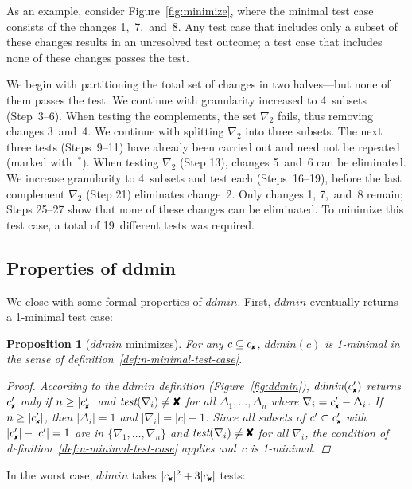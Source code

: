 \documentclass{acm_proc_article-sp}
\newcommand{\FAIL}{\text{\ding{56}}\xspace}
\newcommand{\cfail}{{c_{\scriptscriptstyle \FAIL}}}
\newcommand{\dfail}{{c'_{\scriptscriptstyle \FAIL}}}
\newcommand{\test}{\textit{test}\xspace}
\newcommand{\ddmin}{\textit{ddmin}\xspace}
\theoremstyle{plain}
\newtheorem{proposition}[definition]{Proposition}
\begin{document}
As an example, consider Figure~\ref{fig:minimize}, where the minimal
test case consists of the changes 1,~7,~and~8.  Any test case that
includes only a subset of these changes results in an unresolved test
outcome; a test case that includes none of these changes passes the
test.

We begin with partitioning the total set of changes in two
halves---but none of them passes the test.  We continue with
granularity increased to 4~subsets (Step~3--6).  When testing the
complements, the set $\nabla_2$ fails, thus removing changes 3~and~4.  We
continue with splitting $\nabla_2$ into three subsets.  The next three
tests (Steps~9--11) have already been carried out and need not be
repeated (marked with~${}^*$).  When testing $\nabla_2$ (Step 13), changes
5~and~6 can be eliminated.  We increase granularity to 4~subsets and
test each (Steps~16--19), before the last complement $\nabla_2$ (Step 21)
eliminates change~2.  Only changes 1, 7,~and~8 remain; Steps 25--27
show that none of these changes can be eliminated.  To minimize this
test case, a total of 19~different tests was required.

\subsection{Properties of ddmin}
\label{sec:ddmin-complexity}

We close with some formal properties of $\ddmin$.  First, $\ddmin$
eventually returns a 1-minimal test case:

\begin{proposition}[$\ddmin$ minimizes]
\label{pro:ddmin-minimizes}
For any $c \subseteq \cfail$,
$\ddmin(c)$ is 1-minimal in the sense of 
definition~\ref{def:n-minimal-test-case}.
\begin{proof}
  According to the $\ddmin$ definition (Figure~\ref{fig:ddmin}),
  $\ddmin(\dfail)$ returns $\dfail$ only if $n \geq |\dfail|$ and
  $\test(\nabla_i) \neq \FAIL$ for all $\Delta_1, \dots, \Delta_n$ where $\nabla_i
  = \dfail - \Delta_i$.  If $n \geq |\dfail|$, then $|\Delta_i| = 1$ and
  $|\nabla_i| = |c| - 1$.  Since all subsets of $c' \subset \dfail$ with
  $|\dfail| - |c'| = 1$ are in $\{\nabla_1, \dots, \nabla_n\}$ and
  $\test(\nabla_i) \neq \FAIL$ for all $\nabla_i$, the condition of
  definition~\ref{def:n-minimal-test-case} applies and~$c$ is 1-minimal.
\end{proof}
\end{proposition}

\noindent
In the worst case, $\ddmin$ takes $|\cfail|^2 + 3|\cfail|$ tests:
\end{document}
